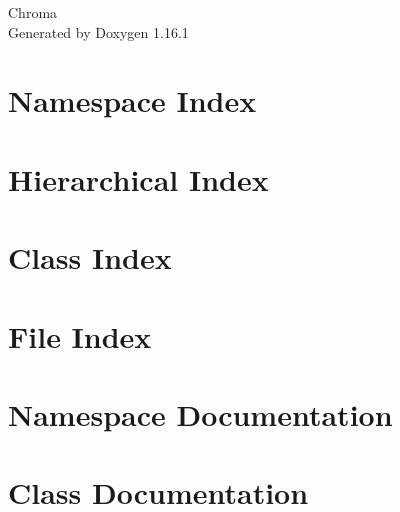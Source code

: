 \documentclass[twoside]{book}
\newcommand{\+}{\discretionary{\mbox{\scriptsize$\hookleftarrow$}}{}{}}
\newcommand{\clearemptydoublepage}{%
    \newpage{\pagestyle{empty}\cleardoublepage}%
  }
\begin{document}
  \raggedbottom
    \hypersetup{pageanchor=false,
                bookmarksnumbered=true,
                pdfencoding=unicode
               }
  \begin{titlepage}
  \vspace*{7cm}
  \begin{center}%
  {\Large Chroma}\\
  \vspace*{1cm}
  {\large Generated by Doxygen 1.16.1}\\
  \end{center}
  \end{titlepage}
  \clearemptydoublepage
  \tableofcontents
  \clearemptydoublepage
  \hypersetup{pageanchor=true}

\chapter{Namespace Index}

\chapter{Hierarchical Index}

\chapter{Class Index}

\chapter{File Index}

\chapter{Namespace Documentation}

\chapter{Class Documentation}






















\end{document}
